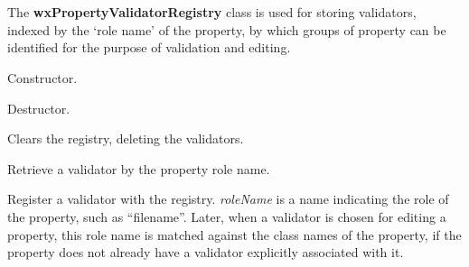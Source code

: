 \section{}\label{wxpropertyvalidatorregistry}

The {\bf wxPropertyValidatorRegistry} class is used for storing validators,
indexed by the `role name' of the property, by which groups of property
can be identified for the purpose of validation and editing.



Constructor.



Destructor.



Clears the registry, deleting the validators.



Retrieve a validator by the property role name.

\label{wxpropertyvalidatorregistervalidator}


Register a validator with the registry. {\it roleName} is a name indicating the
role of the property, such as ``filename''. Later, when a validator is chosen for
editing a property, this role name is matched against the class names of the property,
if the property does not already have a validator explicitly associated with it.


